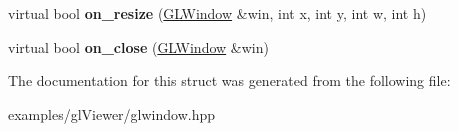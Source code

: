 \begin{DoxyCompactItemize}
\item 
\mbox{\label{structglwindow_1_1_event_handler_a32a807fa383e8d0a7395fea38125ea91}} 
virtual bool {\bfseries on\+\_\+resize} (\hyperlink{classglwindow_1_1_g_l_window}{G\+L\+Window} \&win, int x, int y, int w, int h)
\item 
\mbox{\label{structglwindow_1_1_event_handler_a0bb4bf3ce84c596f781594219aad8198}} 
virtual bool {\bfseries on\+\_\+close} (\hyperlink{classglwindow_1_1_g_l_window}{G\+L\+Window} \&win)
\end{DoxyCompactItemize}


The documentation for this struct was generated from the following file\+:\begin{DoxyCompactItemize}
\item 
examples/gl\+Viewer/glwindow.\+hpp\end{DoxyCompactItemize}
